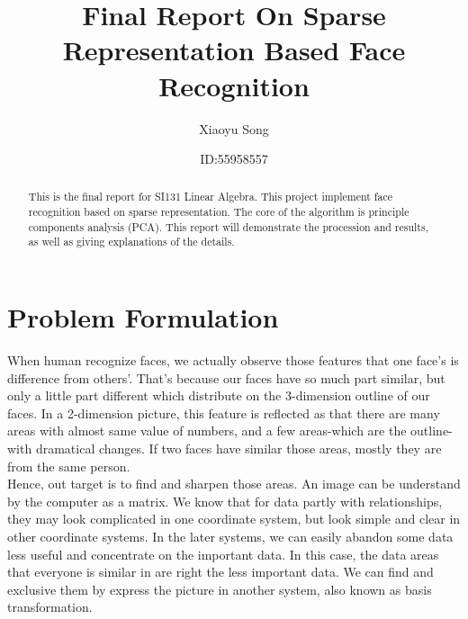 \documentclass[sigconf]{acmart}
\begin{document}
\title{Final Report On Sparse Representation Based Face Recognition}


\author{Xiaoyu Song}
\author{ID:55958557}

\renewcommand{\shortauthors}{X. Song et al.}


\begin{abstract}
This is the final report for SI131 Linear Algebra. This project implement face recognition based on sparse representation. The core of the algorithm is principle components analysis (PCA). This report will demonstrate the procession and results, as well as giving explanations of the details.
\end{abstract}




\maketitle

\section{Problem Formulation}
When human recognize faces, we actually observe those features that one face's is difference from others'. That's because our faces have so much part similar, but only a little part different which distribute on the 3-dimension outline of our faces. In a 2-dimension picture, this feature is reflected as that there are many areas with almost same value of numbers, and a few areas-which are the outline- with dramatical changes. If two faces have similar those areas, mostly they are from the same person.\\

Hence, out target is to find and sharpen those areas. An image can be understand by the computer as a matrix. We know that for data partly with relationships, they may look complicated in one coordinate system, but look simple and clear in other coordinate systems. In the later systems, we can easily abandon some data less useful and concentrate on the important data. In this case, the data areas that everyone is similar in are right the less important data. We can find and exclusive them by express the picture in another system, also known as basis transformation.\\
\end{document}
